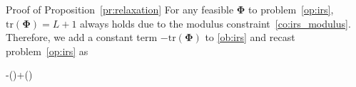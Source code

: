 \documentclass[journal]{IEEEtran}
\begin{document}
	\begin{appendix}
		\begin{subsection}{Proof of Proposition~\ref{pr:relaxation}}\label{ap:relaxation}
			For any feasible $\boldsymbol{\Phi}$ to problem~\eqref{op:irs}, $\mathrm{tr}(\boldsymbol{\Phi})=L+1$ always holds due to the modulus constraint~\eqref{co:irs_modulus}. Therefore, we add a constant term $-\mathrm{tr}(\boldsymbol{\Phi})$ to \eqref{ob:irs} and recast problem~\eqref{op:irs} as
			\begin{maxi!}
				{\boldsymbol{\Phi}}{-(\boldsymbol{\Phi})+(\boldsymbol{\Phi})}{\label{op:irs_equivalent}}{\label{ob:irs_equivalent}}
				\label{co:irs_equivalent_rate}
				\label{co:irs_equivalent_modulus}
				\label{co:irs_equivalent_sd}
			\end{maxi!}


\end{subsection}
\end{appendix}
\end{document}
